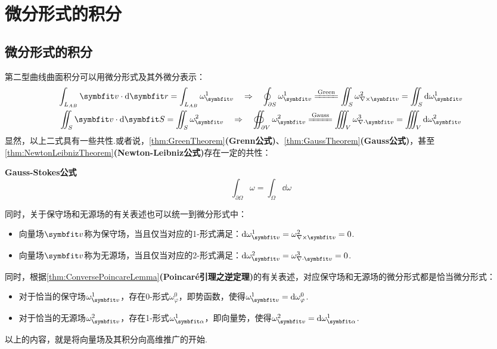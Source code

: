 \section{微分形式的积分}
\subsection{微分形式的积分}
第二型曲线曲面积分可以用微分形式及其外微分表示：
\begin{gather*}
    \int_{L_{AB}}\vb{v}\cdot\dd{\vb{r}} = \int_{L_{AB}}\omega^1_{\vb{v}} \quad\Rightarrow\quad \oint_{\partial S} \omega^1_{\vb{v}} \xlongequal{\text{Green}} \iint_{S}\omega^2_{\nabla\times\vb{v}} = \iint_S \dd{\omega^1_{\vb{v}}} \\
    \iint_S \vb{v}\cdot\dd{\vb{S}} = \iint_{S}\omega^2_{\vb{v}} \quad\Rightarrow\quad \oiint_{\partial V} \omega^2_{\vb{v}} \xlongequal{\text{Gauss}} \iiint_V \omega^3_{\nabla\cdot\vb{v}} = \iiint_V \dd{\omega^2_{\vb{v}}}
\end{gather*}
显然，以上二式具有一些共性.或者说，\cref{thm:GreenTheorem}\textbf{(Grenn公式)}、\cref{thm:GaussTheorem}\textbf{(Gauss公式)}，甚至\cref{thm:NewtonLeibnizTheorem}\textbf{(Newton-Leibniz公式)}存在一定的共性：
\begin{theorem}
    \textbf{Gauss-Stokes公式}
    \[\int_{\partial\Omega}\omega = \int_{\Omega}\dd{\omega}\]
\end{theorem}

同时，关于保守场和无源场的有关表述也可以统一到微分形式中：
\begin{itemize}
    \item 向量场$\vb{v}$称为保守场，当且仅当对应的1-形式满足：$\dd{\omega^1_{\vb{v}}} = \omega^2_{\nabla\times\vb{v}} = 0$.
    \item 向量场$\vb{v}$称为无源场，当且仅当对应的2-形式满足：$\dd{\omega^2_{\vb{v}}} = \omega^3_{\nabla\cdot\vb{v}} = 0$.
\end{itemize}
同时，根据\cref{thm:ConversePoincareLemma}\textbf{(Poincaré引理之逆定理)}的有关表述，对应保守场和无源场的微分形式都是恰当微分形式：
\begin{itemize}
    \item 对于恰当的保守场$\omega^1_{\vb{v}}$，存在0-形式$\omega^0_\varphi$，即势函数，使得$\omega^1_{\vb{v}} = \dd{\omega^0_\varphi}$.
    \item 对于恰当的无源场$\omega^2_{\vb{v}}$，存在1-形式$\omega^1_{\vb{\alpha}}$，即向量势，使得$\omega^2_{\vb{v}} = \dd{\omega^1_{\vb{\alpha}}}$.
\end{itemize}
以上的内容，就是将向量场及其积分向高维推广的开始.